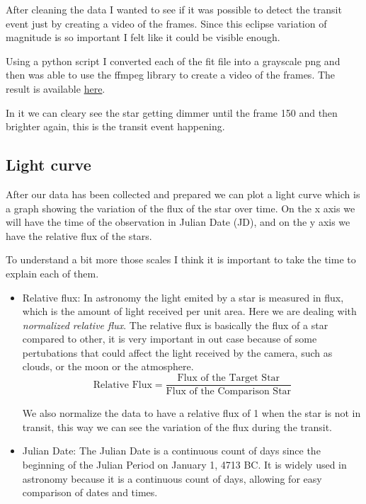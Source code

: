 \documentclass[12pt,a4paper]{article}
\begin{document}
\medskip

After cleaning the data I wanted to see if it was possible to detect the transit event just by creating a video of the frames.
Since this eclipse variation of magnitude is so important I felt like it could be visible enough.

\bigskip

Using a python script I converted each of the fit file into a grayscale png and then was able to use the ffmpeg library to create a video of the frames.
The result is available \href{https://youtube.com/shorts/rVnEccCb3Aw}{here}.

In it we can cleary see the star getting dimmer until the frame 150 and then brighter again, this is the transit event happening.


\subsection{Light curve}

After our data has been collected and prepared we can plot a light curve which is a graph showing the variation of the flux of the star over time.
On the x axis we will have the time of the observation in Julian Date (JD), and on the y axis we have the relative flux of the stars.

To understand a bit more those scales I think it is important to take the time to explain each of them.
\begin{itemize}
    \item Relative flux: In astronomy the light emited by a star is measured in flux, which is the amount of light received per unit area. Here we are dealing with \textit{normalized relative flux}. 
    The relative flux is basically the flux of a star compared to other, it is very important in out case because of some pertubations that could affect the light received by the camera, such as clouds, or the moon or the atmosphere.
    \begin{equation}
        \text{Relative Flux} = \frac{\text{Flux of the Target Star}}{\text{Flux of the Comparison Star}}
    \end{equation}

    We also normalize the data to have a relative flux of 1 when the star is not in transit, this way we can see the variation of the flux during the transit.
    \item Julian Date: The Julian Date is a continuous count of days since the beginning of the Julian Period on January 1, 4713 BC. 
    It is widely used in astronomy because it is a continuous count of days, allowing for easy comparison of dates and times.
\end{itemize}
\end{document}
